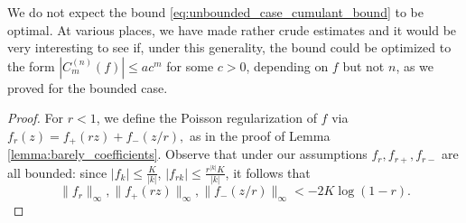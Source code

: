 \documentclass[10pt,a4paper]{amsart}
\begin{document}
\begin{remark}
    We do not expect the bound \eqref{eq:unbounded_case_cumulant_bound} to be optimal. At various places, we have made rather crude estimates and it would be very interesting to see if, under this generality, the bound could be optimized to the form $\left|C_m^{(n)}(f)\right|\leq a c^m$ for some $c>0$, depending on $f$ but not $n$, as we proved for the bounded case.
\end{remark}

\begin{proof}
For $r<1$, we define the Poisson regularization of $f$ via $f_r(z)=f_+(rz)+ f_-(z/r),$ as in the proof of Lemma \ref{lemma:barely_coefficients}. Observe that under our assumptions $f_r, f_{r+}, f_{r-}$ are all bounded: since $|f_k|\leq \frac{K}{|k|}$, $|f_{rk}|\leq \frac{r^{|k|}K}{|k|}$, it follows that $$\|f_r\|_{\infty},\|f_+(rz)\|_{\infty},\|f_-({z/r})\|_{\infty}<-2K\log(1-r).$$



\end{proof}
\end{document}

